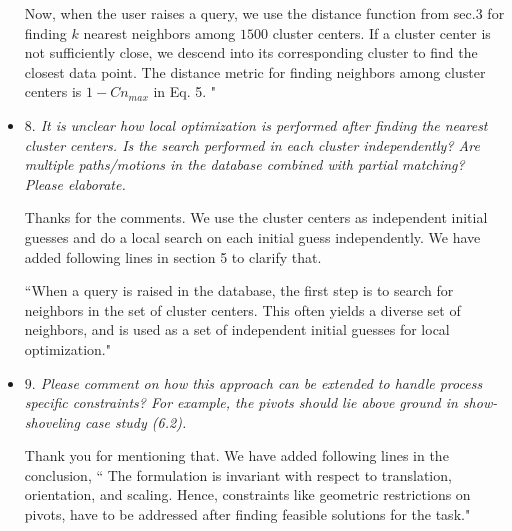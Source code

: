 \documentclass{article}
\begin{document}
\begin{itemize}
Now, when the user raises a query, we use the distance function from sec.3 for finding $k$ nearest neighbors among $1500$ cluster centers.
If a cluster center is not sufficiently close, we descend into its corresponding cluster to find the closest data point.
The distance metric for finding neighbors among cluster centers is $1-Cn_{max}$ in Eq. 5.  "
\\

  \item[] \emph{
$8.$ It is unclear how local optimization is performed after finding the nearest cluster centers. Is the
search performed in each cluster independently? Are multiple paths/motions in the database
combined with partial matching? Please elaborate.
}

Thanks for the comments.
We use the cluster centers as independent initial guesses and do a local search on each initial guess independently.
We have added following lines in section 5 to clarify that.

``When a query is raised in the database, the first step is to search for neighbors in the set of cluster centers.
This often yields a diverse set of neighbors, and is used as a set of independent initial guesses for local optimization."
\\


  \item[] \emph{
$9.$ Please comment on how this approach can be extended to handle process specific constraints?
For example, the pivots should lie above ground in show-shoveling case study (6.2).
}

Thank you for mentioning that. We have added following lines in the conclusion,
`` The formulation is invariant with respect to translation, orientation, and scaling.
Hence, constraints like geometric restrictions on pivots, have to be addressed after finding feasible solutions for the task."

\end{itemize}



\end{document}
